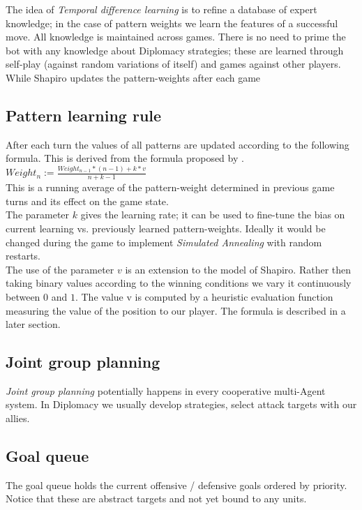 \documentclass[pdftex,12pt,a4paper]{report}
\begin{document}
The idea of \textit{Temporal difference learning} is to refine a
database of expert knowledge; in the case of pattern weights we learn
the features of a successful move. All knowledge is maintained across
games. There is no need to prime the bot with any knowledge about
Diplomacy strategies; these are learned through self-play (against
random variations of itself) and games against other players. While 
Shapiro \cite{Shapiro02} updates the pattern-weights after each game \\

\subsection{Pattern learning rule}

After each turn the values of all patterns are updated
according to the following formula. This is derived from
the formula proposed by \cite{Shapiro02}. \\

$Weight_{n} := \frac{Weight_{n-1}*(n-1)+k*v}{n+k-1}$ \\

This is a running average of the pattern-weight determined
in previous game turns and its effect on the game state. \\

The parameter $k$ gives the learning rate; it can be used
to fine-tune the bias on current learning vs. previously
learned pattern-weights. Ideally it would be changed during
the game to implement \textit{Simulated Annealing} with
random restarts. \\

The use of the parameter $v$ is an extension to the model
of Shapiro. Rather then taking binary values according to
the winning conditions we vary it continuously between
$0$ and $1$. The value v is computed by a heuristic 
evaluation function measuring the value of the position
to our player. The formula is described in a later section. \\


\subsection{Joint group planning}
\textit{Joint group planning} potentially happens in every
cooperative multi-Agent system. In Diplomacy we usually develop
strategies, select attack targets with our allies.  

\subsection{Goal queue}
The goal queue holds the current offensive / defensive
goals ordered by priority. Notice that these are abstract
targets and not yet bound to any units.
\end{document}
